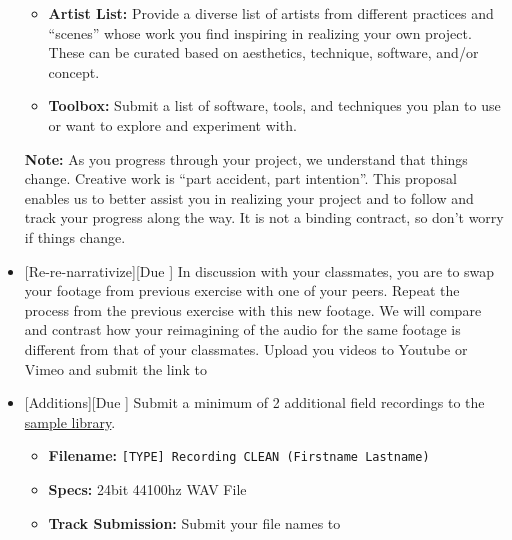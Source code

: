 \begin{itemize}[noitemsep,topsep=0pt,leftmargin=*]
\begin{itemize}
		      \item \textbf{Artist List:} Provide a diverse list of artists from different practices and ``scenes'' whose work you find inspiring in realizing your own project. These can be curated based on aesthetics, technique, software, and/or concept.
		      \item \textbf{Toolbox:} Submit a list of software, tools, and techniques you plan to use or want to explore and experiment with.
	      \end{itemize}
	      \small{\textbf{Note:} As you progress through your project, we understand that things change. Creative work is ``part accident, part intention''. This proposal enables us to better assist you in realizing your project and to follow and track your progress along the way. It is not a binding contract, so don't worry if things change.}

	\item {}[Re-re-narrativize][Due \dSun] \newline
	      In discussion with your classmates, you are to swap your footage from previous exercise with one of your peers. Repeat the process from the previous exercise with this new footage. We will compare and contrast how your reimagining of the audio for the same footage is different from that of your classmates. Upload you videos to Youtube or Vimeo and submit the link to \discordE

	\item {}[Additions][Due \dSun] \newline
	      Submit a minimum of 2 additional field recordings to the \href{\samplelibPermURL}{sample library}.
	      \begin{itemize}
		      \item \textbf{Filename:} \texttt{[TYPE] Recording CLEAN (Firstname Lastname)}
		      \item \textbf{Specs:} 24bit 44100hz WAV File
		      \item \textbf{Track Submission:} Submit your file names to \discordS
	      \end{itemize}
\end{itemize}